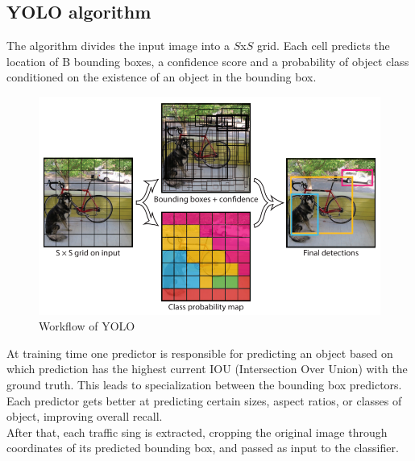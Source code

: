 \documentclass[10pt,twocolumn,letterpaper]{article}
\begin{document}
\subsection{YOLO algorithm}
The algorithm divides the input image into a $S$x$S$ grid. Each cell predicts the location of B bounding boxes, a confidence score and a probability of object class conditioned on the existence of an object in the bounding box. 
\begin{figure}[h]
	\includegraphics[width=\linewidth]{Res/Immagini/yoloAlg.PNG}	
	\caption{Workflow of YOLO}
\end{figure}
At training time one predictor is responsible for predicting an object based on which prediction has the highest current IOU (Intersection Over Union) with the ground truth. This leads to specialization between the bounding box predictors. Each predictor gets better at predicting certain sizes, aspect ratios, or classes of object, improving overall recall.\\
After that, each traffic sing is extracted, cropping the original image through coordinates of its predicted bounding box, and passed as input to the classifier.
\end{document}
